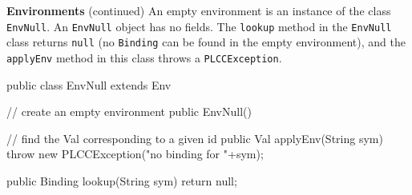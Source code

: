 \begin{minipage}[t]{\sw}
\slidenumber
\LARGE
{\bf Environments} (continued)\exx
An empty environment is an instance of the class \verb'EnvNull'.
An \verb'EnvNull' object has no fields.
The \verb'lookup' method in the \verb'EnvNull' class returns \verb'null'
(no \verb'Binding' can be found in the empty environment),
and the \verb'applyEnv' method in this class throws a \verb'PLCCException'.
{\Large
\begin{qv}
public class EnvNull extends Env {

    // create an empty environment
    public EnvNull() {
    }

    // find the Val corresponding to a given id
    public Val applyEnv(String sym) {
        throw new PLCCException("no binding for "+sym);
    }

    public Binding lookup(String sym) {
        return null;
    }

}
\end{qv}
}
\end{minipage}
\clearpage
